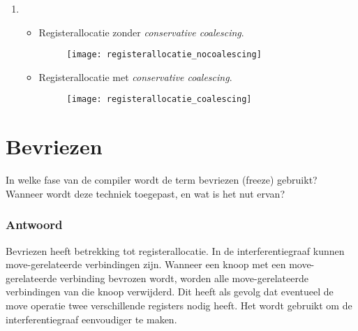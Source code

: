 \documentclass{report}
\newcommand{\answer}[1]{
		\subsubsection*{Antwoord}
			#1
}
\begin{document}
{\begin{enumerate}
			\item 
			\begin{itemize}
				\item Registerallocatie zonder \textit{conservative coalescing}.
				\begin{figure}[ht]
					\centering
					\texttt{[image: registerallocatie\_nocoalescing]}
				\end{figure}
				\item Registerallocatie met \textit{conservative coalescing}.
				\begin{figure}[ht]
					\centering
					\texttt{[image: registerallocatie\_coalescing]}
				\end{figure}
			\end{itemize}

		\end{enumerate}
	}
	\newpage
\section{Bevriezen}
	 In welke fase van de compiler wordt de term bevriezen (freeze) gebruikt? Wanneer wordt deze techniek toegepast, en wat is het nut ervan?
	 \answer{
		Bevriezen heeft betrekking tot registerallocatie. In de interferentiegraaf kunnen move-gerelateerde verbindingen zijn. Wanneer een knoop met een move-gerelateerde verbinding bevrozen wordt, worden alle move-gerelateerde verbindingen van die knoop verwijderd. Dit heeft als gevolg dat eventueel de move operatie twee verschillende registers nodig heeft. Het wordt gebruikt om de interferentiegraaf eenvoudiger te maken.
	 }
	 \newpage
\end{document}
